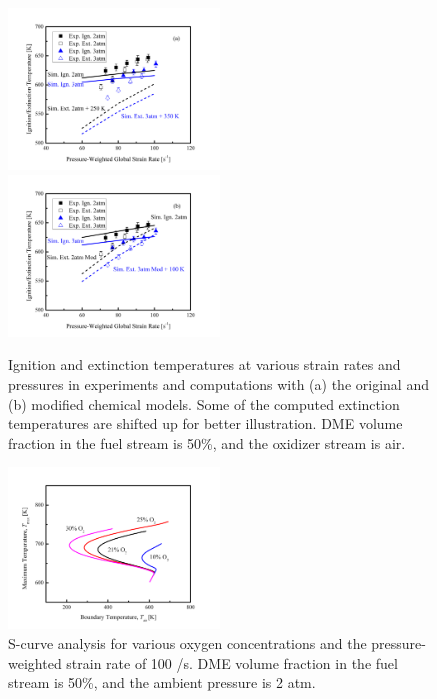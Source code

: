 \documentclass[review,3p,times]{elsarticle}
\begin{document}
\begin{figure}[t]
  \centering
  \scriptsize
  \includegraphics[trim=6.5mm 7.5mm 7mm 8mm, clip=true, width=0.5\textwidth]{cmp_P.png}
  \includegraphics[trim=6.5mm 7.5mm 7mm 8mm, clip=true, width=0.5\textwidth]{cmp_P_mod.png}
  \normalsize
  \caption{Ignition and extinction temperatures at various strain rates and pressures in experiments and computations with (a) the original and (b) modified chemical models.  Some of the computed extinction temperatures are shifted up for better illustration.  DME volume fraction in the fuel stream is 50\%, and the oxidizer stream is air.}
  \label{fig:cmp_P}
\end{figure}

\begin{figure}[t]
  \centering
  \scriptsize
  \includegraphics[trim=6.5mm 7.5mm 7mm 8mm, clip=true, width=0.5\textwidth]{eff_O2.png}
  \normalsize
  \caption{S-curve analysis for various oxygen concentrations and the pressure-weighted strain rate of 100 /s.  DME volume fraction in the fuel stream is 50\%, and the ambient pressure is 2 atm.}
  \label{fig:eff_O2}
\end{figure}
\end{document}
